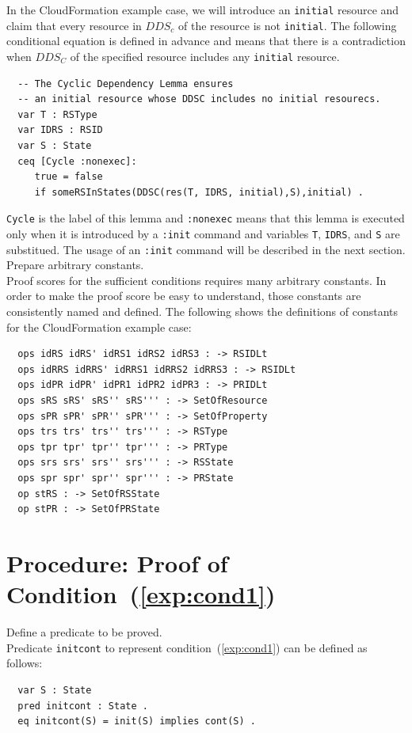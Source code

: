 \documentclass[12pt]{report}
\begin{document}
In the CloudFormation example case, we will introduce an {\tt initial}
resource and claim that every resource in $DDS_c$ of the resource is
not {\tt initial}. The following conditional equation is defined in
advance and means that there is a contradiction when $DDS_C$ of the
specified resource includes any {\tt initial} resource.
\small
\begin{verbatim}
  -- The Cyclic Dependency Lemma ensures
  -- an initial resource whose DDSC includes no initial resourecs.
  var T : RSType
  var IDRS : RSID
  var S : State
  ceq [Cycle :nonexec]: 
     true = false
     if someRSInStates(DDSC(res(T, IDRS, initial),S),initial) .
\end{verbatim}
\normalsize
{\tt Cycle} is the label of this lemma and {\tt :nonexec} means that
this lemma is executed only when it is introduced by a {\tt :init}
command and variables {\tt T}, {\tt IDRS}, and {\tt S} are
substitued. The usage of an {\tt :init} command will be described in
the next section.\\

 Prepare arbitrary constants. \\
Proof scores for the sufficient conditions requires many arbitrary constants.
In order to make the proof score be easy to understand, those constants
are consistently named and defined. The following shows the definitions
of constants for the CloudFormation example case:
\small
\begin{verbatim}
  ops idRS idRS' idRS1 idRS2 idRS3 : -> RSIDLt
  ops idRRS idRRS' idRRS1 idRRS2 idRRS3 : -> RSIDLt
  ops idPR idPR' idPR1 idPR2 idPR3 : -> PRIDLt
  ops sRS sRS' sRS'' sRS''' : -> SetOfResource
  ops sPR sPR' sPR'' sPR''' : -> SetOfProperty
  ops trs trs' trs'' trs''' : -> RSType
  ops tpr tpr' tpr'' tpr''' : -> PRType
  ops srs srs' srs'' srs''' : -> RSState
  ops spr spr' spr'' spr''' : -> PRState
  op stRS : -> SetOfRSState
  op stPR : -> SetOfPRState
\end{verbatim}
\normalsize
\section{Procedure: Proof of Condition~(\ref{exp:cond1})}
\label{sec:initcont}
 Define a predicate to be proved. \\
Predicate {\tt initcont} to represent condition~(\ref{exp:cond1}) can be defined as follows:
\small
\begin{verbatim}
  var S : State
  pred initcont : State .
  eq initcont(S) = init(S) implies cont(S) .
\end{verbatim}
\normalsize
\end{document}
